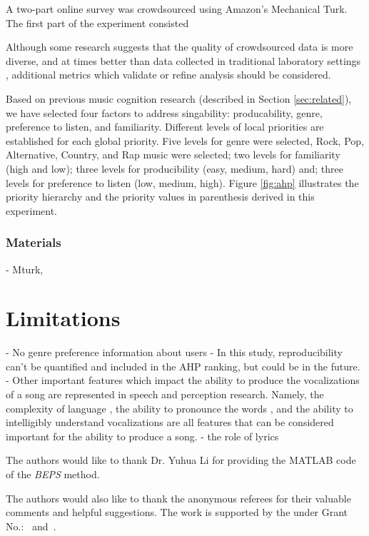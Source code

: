 A two-part online survey was crowdsourced using Amazon's Mechanical Turk. The first part of the experiment consisted

Although some research suggests that the quality of crowdsourced data is more diverse, and at times better than data collected in traditional laboratory settings \cite{behrend2011viability}, additional metrics which validate or refine analysis should be considered. 

Based on previous music cognition research (described in Section \ref{sec:related}), we have selected four factors to address singability: producability, genre, preference to listen, and familiarity. Different levels of local priorities are established for each global priority. Five levels for genre were selected, Rock, Pop, Alternative, Country, and Rap music were selected; two levels for familiarity (high and low); three levels for producibility (easy, medium, hard) and; three levels for preference to listen (low, medium, high). Figure \ref{fig:ahp} illustrates the priority hierarchy and the priority values in parenthesis derived in this experiment.

\subsubsection{Materials}
- Mturk, 


\section{Limitations}
- No genre preference information about users
- In this study, reproducibility can't be quantified and included in the AHP ranking, but could be in the future.
- Other important features which impact the ability to produce the vocalizations of a song are represented in speech and perception research. Namely, the complexity of language \cite{ellis15}, the ability to pronounce the words \cite{patil2010evaluating}, and the ability to intelligibly understand vocalizations \cite{ibrahim17} are all features that can be considered important for the ability to produce a song.
- the role of lyrics


\begin{acks}
  The authors would like to thank Dr. Yuhua Li for providing the
  MATLAB code of the \textit{BEPS} method.

  The authors would also like to thank the anonymous referees for
  their valuable comments and helpful suggestions. The work is
  supported by the  under Grant
  No.:~
  and~.

\end{acks}
